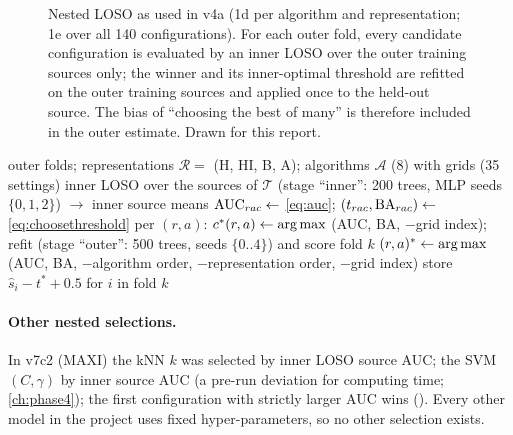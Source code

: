 \begin{figure}[htbp]
\caption[Nested leave-one-source-out]{Nested LOSO as used in v4a (1d per algorithm and representation; 1e over all 140
configurations). For each outer fold, every candidate configuration is evaluated by an inner LOSO over the outer
training sources only; the winner and its inner-optimal threshold are refitted on the outer training sources and applied
once to the held-out source. The bias of ``choosing the best of many'' is therefore included in the outer estimate.
Drawn for this report.}
\label{fig:nested}
\end{figure}

\begin{algorithm}[htbp]
\caption{Nested automatic selection, v4a 1e (, )}\label{alg:nested}
\begin{algorithmic}[1]
\Require outer folds; representations $\mathcal R=$ (H, HI, B, A); algorithms $\mathcal A$ (8) with grids  (35 settings)
      \State inner LOSO over the sources of $\mathcal T$ (stage ``inner'': 200 trees, MLP seeds $\{0,1,2\}$) $\to$ inner source means
      \State $\operatorname{AUC}_{rac}\gets$ \cref{eq:auc}; $(t_{rac},\operatorname{BA}_{rac})\gets$ \cref{eq:choosethreshold}
   \EndFor
   \State per $(r,a)$: $c^\ast(r,a)\gets\operatorname*{arg\,max}$ (AUC, BA, $-$grid index); refit (stage ``outer'': 500 trees, seeds $\{0..4\}$) and score fold $k$ 
   \State $(r,a)^\ast\gets\operatorname*{arg\,max}$ (AUC, BA, $-$algorithm order, $-$representation order, $-$grid index) 
   \State store $\hat s_i-t^\ast+0.5$ for $i$ in fold $k$
\EndFor
\end{algorithmic}
\end{algorithm}

\paragraph{Other nested selections.} In v7c2 (MAXI) the kNN $k$ was selected by inner LOSO source AUC; the SVM $(C,\gamma)$
by inner  source AUC (a pre-run deviation for computing time; \cref{ch:phase4}); the first
configuration with strictly larger AUC wins (). Every other model in the project uses fixed
hyper-parameters, so no other selection exists.

